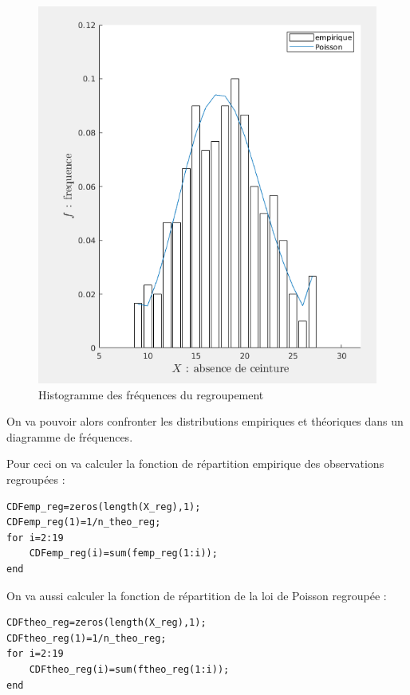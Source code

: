 \documentclass[a4paper,oneside]{article}
\makeatletter
\def\bigcenter{\trivlist \bigcentering\item\relax}
\def\bigcentering{\let\\\@centercr\rightskip\@bigflushglue%
\leftskip\@bigflushglue
\parindent\z@\parfillskip\z@skip}
\makeatother
\begin{document}
\begin{enumerate}
\begin{figure}[h!]
\bigcenter
\includegraphics[scale=0.7]{fig2_sub1.png}
\caption{Histogramme des fréquences du regroupement}
\end{figure}

\pagebreak

On va pouvoir alors confronter les distributions empiriques et théoriques dans un diagramme de fréquences.

Pour ceci on va calculer la fonction de répartition empirique des observations regroupées :

\begin{lstlisting}
CDFemp_reg=zeros(length(X_reg),1);
CDFemp_reg(1)=1/n_theo_reg;
for i=2:19
    CDFemp_reg(i)=sum(femp_reg(1:i));
end
\end{lstlisting}


On va aussi calculer la fonction de répartition de la loi de Poisson regroupée :

\begin{lstlisting}
CDFtheo_reg=zeros(length(X_reg),1);
CDFtheo_reg(1)=1/n_theo_reg;
for i=2:19
    CDFtheo_reg(i)=sum(ftheo_reg(1:i));
end
\end{lstlisting}



\end{enumerate}
\end{document}
